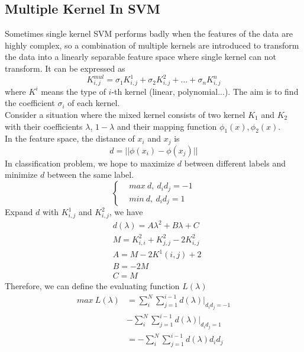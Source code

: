 \documentclass[twocolumn, a4paper]{article}
\begin{document}
\subsection{Multiple Kernel In SVM}
Sometimes single kernel SVM performs badly when the features of the data are highly complex, so a combination of multiple kernels are introduced to transform the data into a linearly separable feature space where single kernel can not transform. It can be expressed as
\begin{equation}
\nonumber
  K_{i,j}^{mul} = \sigma_1K_{i,j}^{1}+\sigma_2K_{i,j}^{2}+...+\sigma_nK_{i,j}^{n}
\end{equation}
where $K^i$ means the type of $i$-th kernel (linear, polynomial...). The aim is to find the coefficient $\sigma_i$ of each kernel.\\
Consider a situation where the mixed kernel consists of two kernel $K_1$ and $K_2$ with their coefficients $\lambda$, $1-\lambda$ and their mapping function $\phi_1(x), \phi_2(x)$.\\
In the feature space, the distance of $x_i$ and $x_j$ is 
\begin{equation}
\nonumber
  d=||\phi(x_i)-\phi(x_j)||
\end{equation}
In classification problem, we hope to maximize $d$ between different labels and minimize $d$ between the same label.
\begin{equation}
\left\{
\begin{aligned}
\nonumber
&max\ d,\ d_id_j=-1\\
&min\ d,\ d_id_j=1 
\end{aligned}
\right.
\end{equation}
Expand $d$ with $K^1_{i,j}$ and $K^2_{i,j}$, we have
\begin{equation}
{
\begin{aligned}
\nonumber
&d(\lambda)=A\lambda^2+B\lambda+C\\
&M=K^2_{i,i}+K^2_{j,j}-2K^2_{i,j} \\
&A=M-2K^1(i,j)+2\\
&B=-2M\\
&C=M
\end{aligned}
}
\end{equation}
Therefore, we can define the evaluating function $L(\lambda)$
\begin{equation}
{
\begin{aligned}
\nonumber
  max\ L(\lambda)&=\sum_{i}^N\sum_{j=1}^{i-1}d(\lambda)|_{d_id_j=-1}\\ &-\sum_{i}^N\sum_{j=1}^{i-1}d(\lambda)|_{d_id_j=1}\\ &= -\sum_{i}^N\sum_{j=1}^{i-1}d(\lambda)d_id_j
  \end{aligned}
}
\end{equation}
\end{document}
